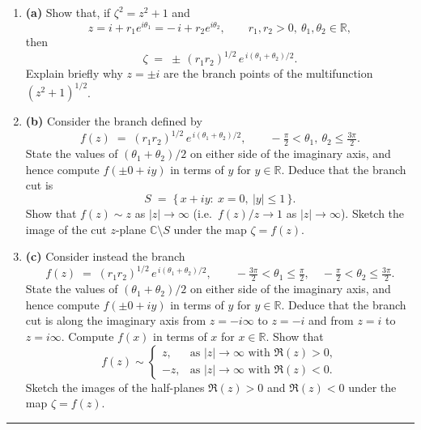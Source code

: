 \documentclass[11pt]{article}
\begin{document}
\begin{enumerate}[label=(\alph*),leftmargin=2.1em]
	
	\item \textbf{(a)}\;
	Show that, if \(\zeta^{2}=z^{2}+1\) and
	\[
	z = i + r_{1}e^{i\theta_{1}} = -\,i + r_{2}e^{i\theta_{2}},
	\qquad r_{1},r_{2}>0,\ \theta_{1},\theta_{2}\in\mathbb{R},
	\]
	then
	\[
	\zeta \;=\; \pm\,(r_{1}r_{2})^{1/2}\,e^{\,i(\theta_{1}+\theta_{2})/2}.
	\]
	Explain briefly why \(z=\pm i\) are the branch points of the multifunction \((z^{2}+1)^{1/2}\).
	
	\medskip
	
	\item \textbf{(b)}\;
	Consider the branch defined by
	\[
	f(z) \;=\; (r_{1}r_{2})^{1/2} \, e^{\,i(\theta_{1}+\theta_{2})/2},
	\qquad -\tfrac{\pi}{2}<\theta_{1},\ \theta_{2}\le \tfrac{3\pi}{2}.
	\]
	State the values of \((\theta_{1}+\theta_{2})/2\) on either side of the imaginary axis,
	and hence compute \(f(\pm0+iy)\) in terms of \(y\) for \(y\in\mathbb{R}\).
	Deduce that the branch cut is
	\[
	S \;=\; \{\,x+iy:\ x=0,\ |y|\le 1\,\}.
	\]
	Show that \(f(z)\sim z\) as \(|z|\to\infty\)
	(i.e.\ \(f(z)/z\to 1\) as \(|z|\to\infty\)).
	Sketch the image of the cut \(z\)-plane \(\mathbb{C}\setminus S\) under the map \(\zeta=f(z)\).
	
	\medskip
	
	\item \textbf{(c)}\;
	Consider instead the branch
	\[
	f(z) \;=\; (r_{1}r_{2})^{1/2} \, e^{\,i(\theta_{1}+\theta_{2})/2},
	\qquad -\tfrac{3\pi}{2}<\theta_{1}\le \tfrac{\pi}{2},\quad
	-\tfrac{\pi}{2}<\theta_{2}\le \tfrac{3\pi}{2}.
	\]
	State the values of \((\theta_{1}+\theta_{2})/2\) on either side of the imaginary axis,
	and hence compute \(f(\pm0+iy)\) in terms of \(y\) for \(y\in\mathbb{R}\).
	Deduce that the branch cut is along the imaginary axis
	from \(z=-i\infty\) to \(z=-i\) and from \(z=i\) to \(z=i\infty\).
	Compute \(f(x)\) in terms of \(x\) for \(x\in\mathbb{R}\).
	Show that
	\[
	f(z)\sim
	\begin{cases}
		z,  & \text{as } |z|\to\infty \text{ with } \Re(z)>0,\\[2pt]
		-z,  & \text{as } |z|\to\infty \text{ with } \Re(z)<0.
	\end{cases}
	\]
	Sketch the images of the half-planes \(\Re(z)>0\) and \(\Re(z)<0\) under the map \(\zeta=f(z)\).
	
\end{enumerate}
	
	\bigskip\hrule\bigskip
	
\end{document}
